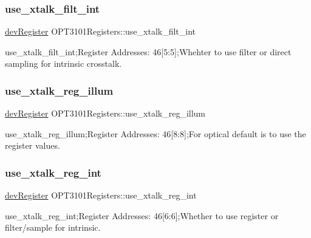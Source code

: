 \subsubsection{\texorpdfstring{use\+\_\+xtalk\+\_\+filt\+\_\+int}{use\_xtalk\_filt\_int}}
{\footnotesize\ttfamily \mbox{\hyperlink{classdev_register}{dev\+Register}} O\+P\+T3101\+Registers\+::use\+\_\+xtalk\+\_\+filt\+\_\+int}



use\+\_\+xtalk\+\_\+filt\+\_\+int;Register Addresses\+: 46\mbox{[}5\+:5\mbox{]};Whehter to use filter or direct sampling for intrinsic crosstalk. 

\mbox{\label{class_o_p_t3101_registers_a5fd95ca60881d151fa12abad6d1a18ad}} 
\subsubsection{\texorpdfstring{use\+\_\+xtalk\+\_\+reg\+\_\+illum}{use\_xtalk\_reg\_illum}}
{\footnotesize\ttfamily \mbox{\hyperlink{classdev_register}{dev\+Register}} O\+P\+T3101\+Registers\+::use\+\_\+xtalk\+\_\+reg\+\_\+illum}



use\+\_\+xtalk\+\_\+reg\+\_\+illum;Register Addresses\+: 46\mbox{[}8\+:8\mbox{]};For optical default is to use the register values. 

\mbox{\label{class_o_p_t3101_registers_a5cb06f9ac11c7f0772bae4e99139bf36}} 
\subsubsection{\texorpdfstring{use\+\_\+xtalk\+\_\+reg\+\_\+int}{use\_xtalk\_reg\_int}}
{\footnotesize\ttfamily \mbox{\hyperlink{classdev_register}{dev\+Register}} O\+P\+T3101\+Registers\+::use\+\_\+xtalk\+\_\+reg\+\_\+int}



use\+\_\+xtalk\+\_\+reg\+\_\+int;Register Addresses\+: 46\mbox{[}6\+:6\mbox{]};Whether to use register or filter/sample for intrinsic. 

